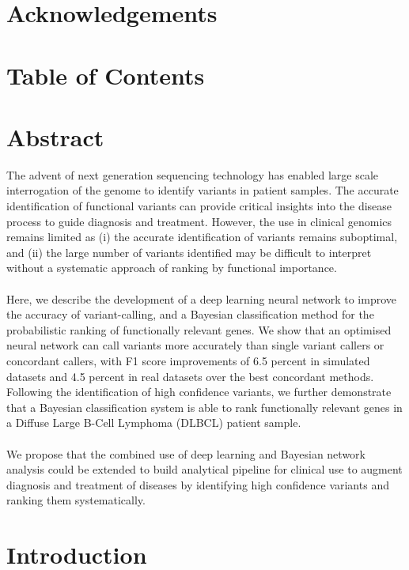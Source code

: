 \documentclass{article}
\begin{document}
\section*{Acknowledgements}
\newpage
\section*{Table of Contents}
\small
\tableofcontents
\newpage
\doublespace
\normalsize
{} 
\section*{Abstract}
The advent of next generation sequencing technology has enabled large scale interrogation of the genome to identify variants in patient samples. The accurate identification of functional variants can provide critical insights into the disease process to guide diagnosis and treatment. However, the use in clinical genomics remains limited as (i) the accurate identification of variants remains suboptimal, and (ii) the large number of variants identified may be difficult to interpret without a systematic approach of ranking by functional importance.\\\\
Here, we describe the development of a deep learning neural network to improve the accuracy of variant-calling, and a Bayesian classification method for the probabilistic ranking of functionally relevant genes. We show that an optimised neural network can call variants more accurately than single variant callers or concordant callers, with F1 score improvements of 6.5 percent in simulated datasets and 4.5 percent in real datasets over the best concordant methods. Following the identification of high confidence variants, we further demonstrate that a Bayesian classification system is able to rank functionally relevant genes in a Diffuse Large B-Cell Lymphoma (DLBCL) patient sample.\\\\ We propose that the combined use of deep learning and Bayesian network analysis could be extended to build analytical pipeline for clinical use to augment diagnosis and treatment of diseases by identifying high confidence variants and ranking them systematically.
\newpage
\section{Introduction}
\end{document}
